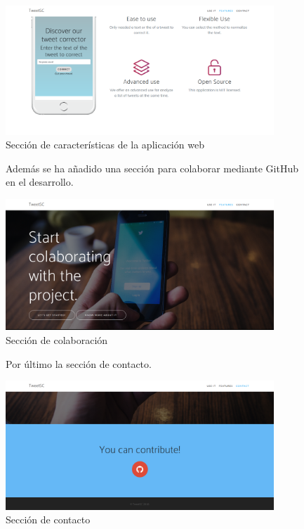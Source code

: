 \documentclass[spanish,12pt, a4paper,twoside]{paper}
\begin{document}
\begin{figure}[h]
\centering
 \includegraphics[width=0.9\textwidth]{recursos/WebFeatures2}
\caption{Sección de características de la aplicación web}
\label{fig:webfeatures2}
\end{figure}

\begin{figure}[h]
Además se ha añadido una sección para colaborar mediante GitHub en el desarrollo.
\begin{center}
 \includegraphics[width=0.9\textwidth]{recursos/WebColaborate}
\caption{Sección de colaboración}
\label{fig:webcolaborate}
\end{center}
\end{figure}

\begin{figure}[h]
Por último la sección de contacto.
\begin{center}
 \includegraphics[width=0.9\textwidth]{recursos/WebContact}
\caption{Sección de contacto}
\label{fig:webcontact}
\end{center}
\end{figure}
\end{document}
